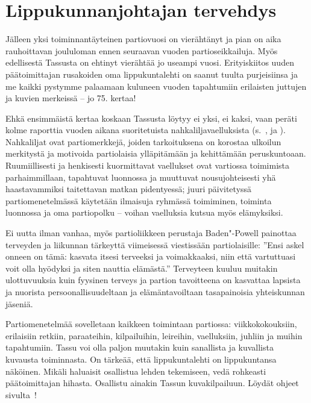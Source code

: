\section{Lippukunnanjohtajan tervehdys}

\begin{multicols}{2}
\noindent Jälleen yksi toiminnantäyteinen partiovuosi on vierähtänyt ja 
pian on aika rauhoittavan joululoman ennen seuraavan vuoden partioseikkailuja. Myös 
edellisestä Tassusta on ehtinyt vierähtää jo useampi vuosi. Erityiskiitos 
uuden päätoimittajan rusakoiden oma lippukuntalehti on saanut tuulta 
purjeisiinsa ja me kaikki pystymme palaamaan kuluneen vuoden tapahtumiin 
erilaisten juttujen ja kuvien merkeissä -- jo 75. kertaa!

Ehkä ensimmäistä kertaa koskaan Tassusta löytyy ei yksi, ei kaksi, vaan 
peräti kolme raporttia vuoden aikana suoritetuista nahkaliljavaelluksista 
(s.~\pageref{section:vihreaNahkalilja}, \pageref{section:mustaNahkalilja} ja 
\pageref{section:punainenNahkalilja}). Nahkaliljat ovat partiomerkkejä, joiden 
tarkoituksena on korostaa ulkoilun merkitystä ja motivoida partiolaisia 
ylläpitämään ja kehittämään peruskuntoaan. Ruumiillisesti ja henkisesti 
kuormittavat vaellukset ovat vartiossa toimimista parhaimmillaan, tapahtuvat 
luonnossa ja muuttuvat nousujohteisesti yhä haastavammiksi taitettavan matkan 
pidentyessä; juuri päivitetyssä partiomenetelmässä käytetään ilmaisuja 
ryhmässä toimiminen, toiminta luonnossa ja oma partiopolku -- voihan 
vaelluksia kutsua myös elämyksiksi.

Ei uutta ilman vanhaa, myös partioliikkeen perustaja Baden"-Powell painottaa
terveyden ja liikunnan tärkeyttä viimeisessä viestissään partiolaisille: 
''Ensi askel onneen on tämä: kasvata itsesi terveeksi ja voimakkaaksi, niin 
että vartuttuasi voit olla hyödyksi ja siten nauttia elämästä.'' 
Terveyteen kuuluu muitakin ulottuvuuksia kuin fyysinen terveys ja partion 
tavoitteena on kasvattaa lapsista ja nuorista persoonallisuudeltaan ja 
elämäntavoiltaan tasapainoisia yhteiskunnan jäseniä.

Partiomenetelmää sovelletaan kaikkeen toimintaan partiossa: viikkokokouksiin, 
erilaisiin retkiin, paraateihin, kilpailuihin, leireihin, vaelluksiin, juhliin 
ja muihin tapahtumiin. Tassu voi olla paljon muutakin kuin sanallista ja 
kuvallista kuvausta toiminnasta. On tärkeää, että lippukuntalehti on 
lippukuntansa näköinen. Mikäli haluaisit osallistua lehden tekemiseen, vedä 
rohkeasti päätoimittajan hihasta. Osallistu ainakin Tassun kuvakilpailuun. 
Löydät ohjeet sivulta~\pageref{section:kuvakilpailu}!


\end{multicols}
